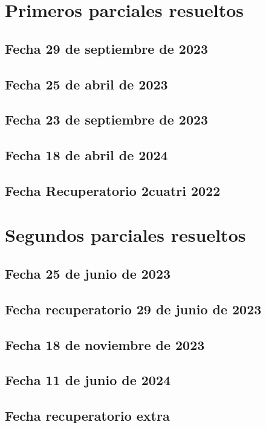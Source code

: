 \documentclass[10pt, a4paper]{report}
\begin{document}
    \chapter{Primeros parciales resueltos}
        \section{Fecha 29 de septiembre de 2023}
            

        \newpage
        \section{Fecha 25 de abril de 2023}
            

            \newpage
        \section{Fecha 23 de septiembre de 2023}
            

            \newpage
        \section{Fecha 18 de abril de 2024}
            
            

        \newpage
        \section{Fecha Recuperatorio 2cuatri 2022}
            


        \newpage
    \chapter{Segundos parciales resueltos}
        \section{Fecha 25 de junio de 2023}
            

        \newpage
        \section{Fecha recuperatorio 29 de junio de 2023}
            

        \newpage
        \section{Fecha 18 de noviembre de 2023}
            

        \newpage
        \section{Fecha 11 de junio de 2024}
            

        \newpage
        \section{Fecha recuperatorio extra}
            
    
\end{document}
